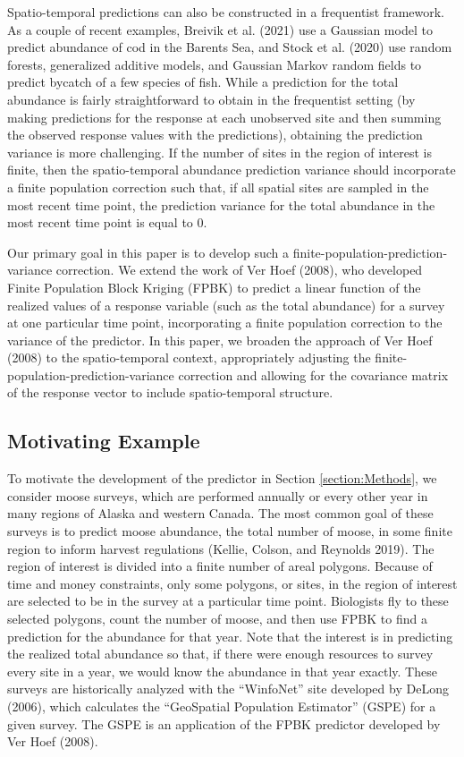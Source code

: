 \documentclass[]{article}    %
\begin{document}
Spatio-temporal predictions can also be constructed in a frequentist
framework. As a couple of recent examples, Breivik et al. (2021) use a
Gaussian model to predict abundance of cod in the Barents Sea, and Stock
et al. (2020) use random forests, generalized additive models, and
Gaussian Markov random fields to predict bycatch of a few species of
fish. While a prediction for the total abundance is fairly
straightforward to obtain in the frequentist setting (by making
predictions for the response at each unobserved site and then summing
the observed response values with the predictions), obtaining the
prediction variance is more challenging. If the number of sites in the
region of interest is finite, then the spatio-temporal abundance
prediction variance should incorporate a finite population correction
such that, if all spatial sites are sampled in the most recent time
point, the prediction variance for the total abundance in the most
recent time point is equal to 0.

Our primary goal in this paper is to develop such a
finite-population-prediction-variance correction. We extend the work of
Ver Hoef (2008), who developed Finite Population Block Kriging (FPBK) to
predict a linear function of the realized values of a response variable
(such as the total abundance) for a survey at one particular time point,
incorporating a finite population correction to the variance of the
predictor. In this paper, we broaden the approach of Ver Hoef (2008) to
the spatio-temporal context, appropriately adjusting the
finite-population-prediction-variance correction and allowing for the
covariance matrix of the response vector to include spatio-temporal
structure.

\hypertarget{motivating-example}{%
\subsection{Motivating Example}\label{motivating-example}}

To motivate the development of the predictor in Section
\ref{section:Methods}, we consider moose surveys, which are performed
annually or every other year in many regions of Alaska and western
Canada. The most common goal of these surveys is to predict moose
abundance, the total number of moose, in some finite region to inform
harvest regulations (Kellie, Colson, and Reynolds 2019). The region of
interest is divided into a finite number of areal polygons. Because of
time and money constraints, only some polygons, or sites, in the region
of interest are selected to be in the survey at a particular time point.
Biologists fly to these selected polygons, count the number of moose,
and then use FPBK to find a prediction for the abundance for that year.
Note that the interest is in predicting the realized total abundance so
that, if there were enough resources to survey every site in a year, we
would know the abundance in that year exactly. These surveys are
historically analyzed with the ``WinfoNet'' site developed by DeLong
(2006), which calculates the ``GeoSpatial Population Estimator'' (GSPE)
for a given survey. The GSPE is an application of the FPBK predictor
developed by Ver Hoef (2008).
\end{document}
